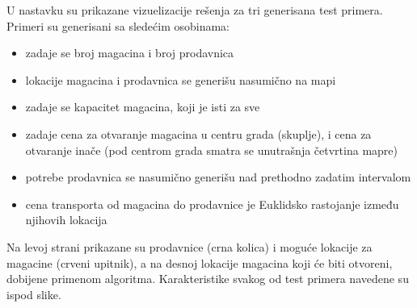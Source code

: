 \documentclass[a4paper]{article}
\begin{document}
U nastavku su prikazane vizuelizacije rešenja za tri generisana test primera. Primeri su generisani sa sledećim osobinama:
\begin{itemize}
    \item zadaje se broj magacina i broj prodavnica
    \item lokacije magacina i prodavnica se generišu nasumično na mapi
    \item zadaje se kapacitet magacina, koji je isti za sve
    \item zadaje cena za otvaranje magacina u centru grada (skuplje), i cena za otvaranje inače (pod centrom grada smatra se unutrašnja četvrtina mapre)
    \item potrebe prodavnica se nasumično generišu nad prethodno zadatim intervalom
    \item cena transporta od magacina do prodavnice je Euklidsko rastojanje između njihovih lokacija
\end{itemize}
Na levoj strani prikazane su prodavnice (crna kolica) i moguće lokacije za magacine (crveni upitnik), a na desnoj lokacije magacina koji će biti otvoreni, dobijene primenom algoritma. Karakteristike svakog od test primera navedene su ispod slike.
\end{document}
